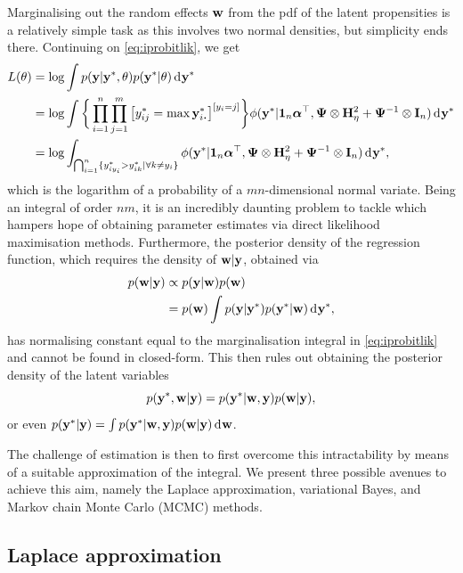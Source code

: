 Marginalising out the random effects ${\mathbf w}$ from the pdf of the latent propensities is a relatively simple task as this involves two normal densities, but simplicity ends there.
Continuing on \cref{eq:iprobitlik}, we get
\begin{align*}
  L(\theta) 
  &= \log \int p(\by|\by^*,\theta) p(\by^*|\theta) \dint \by^* \\
  &= \log \int \bigg\{ \prod_{i=1}^n \prod_{j=1}^m \big[y_{ij}^* 
  = \max \by^*_{i\bigcdot}\big]^{[y_i = j]} \bigg\}
  \phi(\by^*|\bone_n\balpha^\top, \bPsi \otimes \bH_\eta^2 + \bPsi^{-1} \otimes \bI_n) \dint \by^* \\
  &= \log 
  \int_{\bigcap_{i=1}^n  \{ y_{iy_i}^* > y_{ik}^* | \forall k \neq y_i \}}
  \phi(\by^*|\bone_n\balpha^\top, \bPsi \otimes \bH_\eta^2 + \bPsi^{-1} \otimes \bI_n) \dint \by^*,
\end{align*}
which is the logarithm of a probability of a $mn$-dimensional normal variate.
Being an integral of order $nm$, it is an incredibly daunting problem to tackle which hampers hope of obtaining parameter estimates via direct likelihood maximisation methods.
Furthermore, the posterior density of the regression function, which requires the density of ${\mathbf w}|{\mathbf y}$, obtained via 
\begin{align*}
  p({\mathbf w}|{\mathbf y}) 
  &\propto p({\mathbf y}|{\mathbf w})p({\mathbf w}) \\
  &= p({\mathbf w}) \int p({\mathbf y}|{\mathbf y}^*)p({\mathbf y}^*|{\mathbf w}) \operatorname{d}\hspace{0.5pt}\! {\mathbf y}^*,
\end{align*}
has normalising constant equal to the marginalisation integral in  \cref{eq:iprobitlik} and cannot be found in closed-form.
This then rules out obtaining the posterior density of the latent variables
\[
  p({\mathbf y}^*,{\mathbf w}|{\mathbf y}) = p({\mathbf y}^*|{\mathbf w},{\mathbf y})p({\mathbf w}|{\mathbf y}),
\]
or even $p({\mathbf y}^*|{\mathbf y}) = \int p({\mathbf y}^*|{\mathbf w},{\mathbf y})p({\mathbf w}|{\mathbf y}) \operatorname{d}\hspace{0.5pt}\! {\mathbf w}$.

The challenge of estimation is then to first overcome this intractability by means of a suitable approximation of the integral.
We present three possible avenues to achieve this aim, namely the Laplace approximation, variational Bayes, and Markov chain Monte Carlo (MCMC) methods.

\subsection{Laplace approximation}

